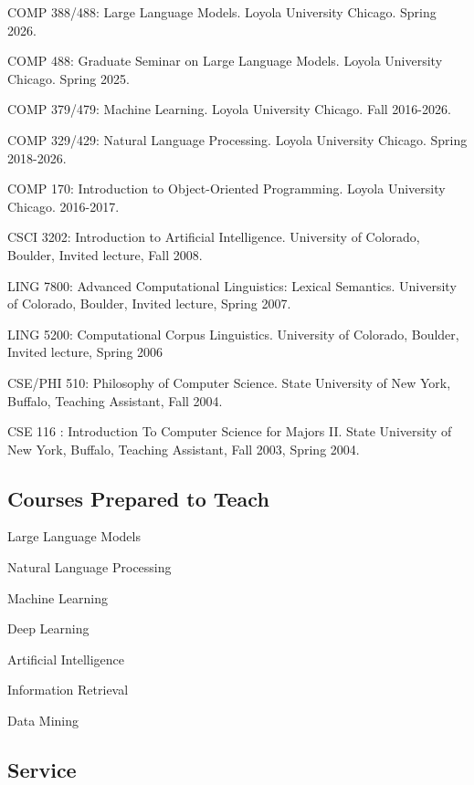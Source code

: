 \documentclass[letterpaper]{article}
\renewenvironment{itemize}{
  \begin{list}{}{
    \setlength{\leftmargin}{1.5em}
  }
}{
  \end{list}
}
\begin{document}
\begin{itemize}
\item COMP 388/488: Large Language Models. Loyola University Chicago. Spring 2026.
\item COMP 488: Graduate Seminar on Large Language Models. Loyola University Chicago. Spring 2025.
\item COMP 379/479: Machine Learning. Loyola University Chicago. Fall 2016-2026.
\item COMP 329/429: Natural Language Processing. Loyola University Chicago. Spring 2018-2026.
\item COMP 170: Introduction to Object-Oriented Programming. Loyola University Chicago. 2016-2017.
\item CSCI 3202: Introduction to Artificial Intelligence. University of Colorado, Boulder, Invited lecture, Fall 2008.
\item LING 7800: Advanced Computational Linguistics: Lexical Semantics. University of Colorado, Boulder, Invited lecture, Spring 2007.
\item LING 5200: Computational Corpus Linguistics. University of Colorado, Boulder, Invited lecture, Spring 2006
\item CSE/PHI 510: Philosophy of Computer Science. State University of New York, Buffalo, Teaching Assistant, Fall 2004.
\item CSE 116 : Introduction To Computer Science for Majors II. State University of New York, Buffalo, Teaching Assistant, Fall 2003, Spring 2004.
\end{itemize}

\subsection*{Courses Prepared to Teach}

\begin{itemize}
\item Large Language Models
\item Natural Language Processing
\item Machine Learning
\item Deep Learning
\item Artificial Intelligence
\item Information Retrieval
\item Data Mining
\end{itemize}

\subsection*{Service}
\end{document}
